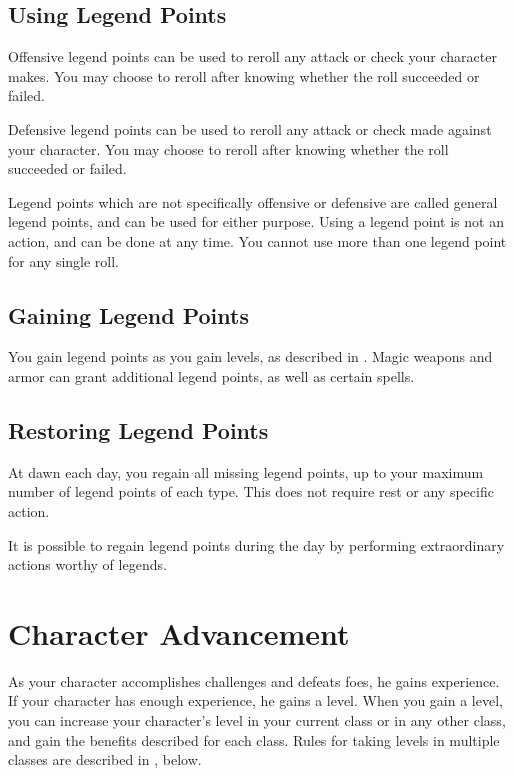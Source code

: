     \subsection{Using Legend Points}

        Offensive legend points can be used to reroll any attack or check your character makes.
        You may choose to reroll after knowing whether the roll succeeded or failed.

        Defensive legend points can be used to reroll any attack or check made against your character.
        You may choose to reroll after knowing whether the roll succeeded or failed.

        Legend points which are not specifically offensive or defensive are called general legend points, and can be used for either purpose.
        Using a legend point is not an action, and can be done at any time.
        You cannot use more than one legend point for any single roll.

    \subsection{Gaining Legend Points}

        You gain legend points as you gain levels, as described in .
        Magic weapons and armor can grant additional legend points, as well as certain spells.

    \subsection{Restoring Legend Points}

        At dawn each day, you regain all missing legend points, up to your maximum number of legend points of each type.
        This does not require rest or any specific action.

        It is possible to regain legend points during the day by performing extraordinary actions worthy of legends.

\section{Character Advancement}\label{Character Advancement}

    As your character accomplishes challenges and defeats foes, he gains experience.
    If your character has enough experience, he gains a level.
    When you gain a level, you can increase your character's level in your current class or in any other class, and gain the benefits described for each class.
    Rules for taking levels in multiple classes are described in , below.

